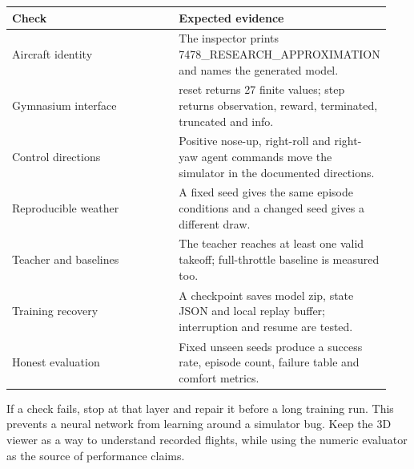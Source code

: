 \documentclass[11pt,a4paper]{article}
\begin{document}
\begin{longtable}{|p{0.47\linewidth}|p{0.47\linewidth}|}\hline
Check & Expected evidence \\ \hline
Aircraft identity & The inspector prints 7478\_RESEARCH\_APPROXIMATION and names the generated model. \\ \hline
Gymnasium interface & reset returns 27 finite values; step returns observation, reward, terminated, truncated and info. \\ \hline
Control directions & Positive nose-up, right-roll and right-yaw agent commands move the simulator in the documented directions. \\ \hline
Reproducible weather & A fixed seed gives the same episode conditions and a changed seed gives a different draw. \\ \hline
Teacher and baselines & The teacher reaches at least one valid takeoff; full-throttle baseline is measured too. \\ \hline
Training recovery & A checkpoint saves model zip, state JSON and local replay buffer; interruption and resume are tested. \\ \hline
Honest evaluation & Fixed unseen seeds produce a success rate, episode count, failure table and comfort metrics. \\ \hline
\end{longtable}
If a check fails, stop at that layer and repair it before a long training run. This prevents a neural network from learning around a simulator bug. Keep the 3D viewer as a way to understand recorded flights, while using the numeric evaluator as the source of performance claims.
\end{document}
